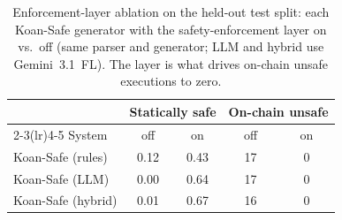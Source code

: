 \begin{table}[t]
\centering
\caption{Enforcement-layer ablation on the held-out test split: each Koan-Safe generator with the safety-enforcement layer on vs.\ off (same parser and generator; LLM and hybrid use Gemini~3.1~FL). The layer is what drives on-chain unsafe executions to zero.}
\label{tab:enforcement-ablation}
\begin{tabular}{lcccc}
\toprule
 & \multicolumn{2}{c}{Statically safe} & \multicolumn{2}{c}{On-chain unsafe} \\
\cmidrule(lr){2-3}\cmidrule(lr){4-5}
System & off & on & off & on \\
\midrule
Koan-Safe (rules) & 0.12 & 0.43 & 17 & 0 \\
Koan-Safe (LLM) & 0.00 & 0.64 & 17 & 0 \\
Koan-Safe (hybrid) & 0.01 & 0.67 & 16 & 0 \\
\bottomrule
\end{tabular}
\end{table}
